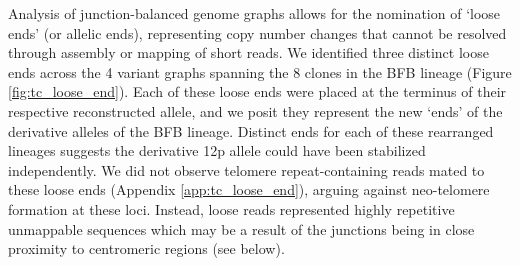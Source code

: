 \documentclass[phd,tocprelim]{cornell}
\renewcommand{\caption}[1]{\singlespacing\hangcaption{#1}\normalspacing}
\begin{document}


Analysis of junction-balanced genome graphs allows for the nomination of ‘loose ends’ (or allelic ends), representing copy number changes that cannot be resolved through assembly or mapping of short reads. We identified three distinct loose ends across the 4 variant graphs spanning the 8 clones in the BFB lineage (Figure \ref{fig:tc_loose_end}). Each of these loose ends were placed at the terminus of their respective reconstructed allele, and we posit they represent the new ‘ends’ of the derivative alleles of the BFB lineage. Distinct ends for each of these rearranged lineages suggests the derivative 12p allele could have been stabilized independently. We did not observe telomere repeat-containing reads mated to these loose ends (Appendix \ref{app:tc_loose_end}), arguing against neo-telomere formation at these loci. Instead, loose reads represented highly repetitive unmappable sequences which may be a result of the junctions being in close proximity to centromeric regions (see below).
\end{document}
